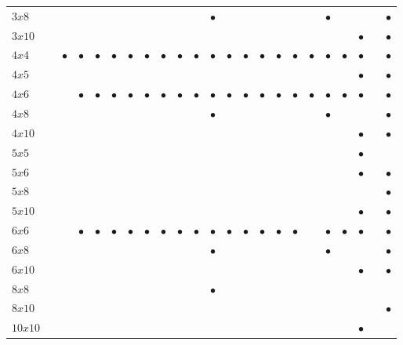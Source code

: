 \documentclass[aps,pra,reprint,amsmath,amssymb,superscriptaddress,floatfix]{revtex4-2}
\def\times{x}%
\begin{document}
\begin{table}[htbp]
\begin{tabular}{lcccccccccccccccccccccc}
$3\times8$  &  &  &  &  &  &  &  &  &  &  & $\bullet$ &  &  &  &  &  &  & $\bullet$ &  &  &  & $\bullet$ \\
$3\times10$ &  &  &  &  &  &  &  &  &  &  &  &  &  &  &  &  &  &  &  & $\bullet$ &  & $\bullet$ \\
$4\times4$  &  & $\bullet$ & $\bullet$ & $\bullet$ & $\bullet$ & $\bullet$ & $\bullet$ & $\bullet$ & $\bullet$ & $\bullet$ & $\bullet$ & $\bullet$ & $\bullet$ & $\bullet$ & $\bullet$ & $\bullet$ & $\bullet$ & $\bullet$ & $\bullet$ & $\bullet$ &  & $\bullet$ \\
$4\times5$  &  &  &  &  &  &  &  &  &  &  &  &  &  &  &  &  &  &  &  & $\bullet$ &  & $\bullet$ \\
$4\times6$  &  &  & $\bullet$ & $\bullet$ & $\bullet$ & $\bullet$ & $\bullet$ & $\bullet$ & $\bullet$ & $\bullet$ & $\bullet$ & $\bullet$ & $\bullet$ & $\bullet$ & $\bullet$ & $\bullet$ & $\bullet$ & $\bullet$ & $\bullet$ & $\bullet$ &  & $\bullet$ \\
$4\times8$  &  &  &  &  &  &  &  &  &  &  & $\bullet$ &  &  &  &  &  &  & $\bullet$ &  &  &  & $\bullet$ \\
$4\times10$ &  &  &  &  &  &  &  &  &  &  &  &  &  &  &  &  &  &  &  & $\bullet$ &  & $\bullet$ \\
$5\times5$  &  &  &  &  &  &  &  &  &  &  &  &  &  &  &  &  &  &  &  & $\bullet$ &  &  \\
$5\times6$  &  &  &  &  &  &  &  &  &  &  &  &  &  &  &  &  &  &  &  & $\bullet$ &  & $\bullet$ \\
$5\times8$  &  &  &  &  &  &  &  &  &  &  &  &  &  &  &  &  &  &  &  &  &  & $\bullet$ \\
$5\times10$ &  &  &  &  &  &  &  &  &  &  &  &  &  &  &  &  &  &  &  & $\bullet$ &  & $\bullet$ \\
$6\times6$  &  &  & $\bullet$ & $\bullet$ & $\bullet$ & $\bullet$ & $\bullet$ & $\bullet$ & $\bullet$ & $\bullet$ & $\bullet$ & $\bullet$ & $\bullet$ & $\bullet$ & $\bullet$ & $\bullet$ &  & $\bullet$ & $\bullet$ & $\bullet$ &  & $\bullet$ \\
$6\times8$  &  &  &  &  &  &  &  &  &  &  & $\bullet$ &  &  &  &  &  &  & $\bullet$ &  &  &  & $\bullet$ \\
$6\times10$ &  &  &  &  &  &  &  &  &  &  &  &  &  &  &  &  &  &  &  & $\bullet$ &  & $\bullet$ \\
$8\times8$  &  &  &  &  &  &  &  &  &  &  & $\bullet$ &  &  &  &  &  &  &  &  &  &  &  \\
$8\times10$ &  &  &  &  &  &  &  &  &  &  &  &  &  &  &  &  &  &  &  &  &  & $\bullet$ \\
$10\times10$&  &  &  &  &  &  &  &  &  &  &  &  &  &  &  &  &  &  &  & $\bullet$ &  &  \\
\bottomrule
\end{tabular}
\end{table}
\end{document}
